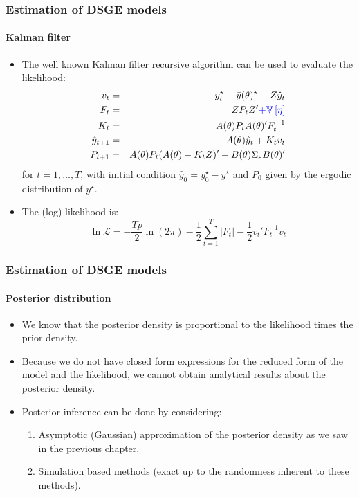 \documentclass[10pt,slidestop]{beamer}
\begin{document}
\begin{frame}
  \frametitle{Estimation of DSGE models}
  \framesubtitle{Kalman filter}
  \begin{itemize}
  \item The well known Kalman filter recursive algorithm can be used to evaluate the likelihood:
  \begin{eqnarray*}
    v_t &=& y^{\star}_t - \bar y(\theta)^{\star} - Z \hat y_t\\
    F_t &=& Z P_t Z' {\color{blue} + \mathbb V \left[\eta\right]}\\
    K_t &=& A(\theta) P_t A(\theta)'F_t^{-1}\\
    \hat y_{t+1} &=& A(\theta) \hat y_t + K_tv_t\\
    P_{t+1} &=& A(\theta) P_t (A(\theta)-K_t Z)'+B(\theta)\Sigma_{\varepsilon} B(\theta)'
  \end{eqnarray*}
  for $t=1,\ldots,T$, with initial condition
  $\hat{y}_0=y_0^{\star}-\bar y^{\star}$ and $P_0$ given by the ergodic
  distribution of $y^{\star}$.

  \bigskip

\item The (log)-likelihood is:
  \[
  \ln \mathcal L = -\frac{Tp}{2}\ln(2\pi)-\frac{1}{2}\sum_{t=1}^T|F_t|-\frac{1}{2}v_t'F_t^{-1}v_t
  \]
  \end{itemize}

\end{frame}


\begin{frame}
  \frametitle{Estimation of DSGE models}
  \framesubtitle{Posterior distribution}

  \begin{itemize}

  \item We know that the posterior density
    is proportional to the likelihood times the prior density.

\bigskip

  \item Because we do not have closed form expressions for the reduced
    form of the model and the likelihood, we cannot obtain analytical
    results about the posterior density.

\bigskip

  \item Posterior inference can be done by considering:

    \begin{enumerate}
    \item Asymptotic (Gaussian) approximation of the posterior density
      as we saw in the previous chapter.
    \item Simulation based methods (exact up to the randomness
      inherent to these methods).
    \end{enumerate}

\end{itemize}

\end{frame}
\end{document}
